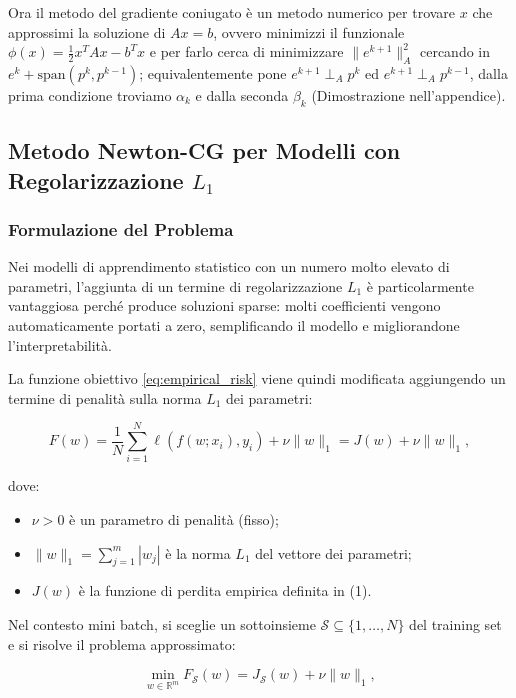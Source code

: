 \documentclass[a4paper,12pt]{article}
\begin{document}
Ora il metodo del gradiente coniugato è un metodo numerico per trovare \(x\) che approssimi la soluzione di \(Ax = b\), ovvero minimizzi il funzionale $
\phi(x) = \frac{1}{2}x^T A x - b^T x$
e per farlo cerca di minimizzare \(\|e^{k+1}\|_A^2\) cercando in \(e^k + \text{span}(p^k, p^{k-1})\); equivalentemente pone \(e^{k+1} \perp_A p^k\) ed \(e^{k+1} \perp_A p^{k-1}\), dalla prima condizione troviamo \(\alpha_k\) e dalla seconda \(\beta_k\) (Dimostrazione nell'appendice).
\newpage
\subsection{Metodo Newton-CG per Modelli con Regolarizzazione $L_1$}

\subsubsection{Formulazione del Problema}

Nei modelli di apprendimento statistico con un numero molto elevato di parametri,
l'aggiunta di un termine di regolarizzazione $L_1$ è particolarmente vantaggiosa
perché produce soluzioni sparse: molti coefficienti vengono
automaticamente portati a zero, semplificando il modello e migliorandone
l'interpretabilità.

La funzione obiettivo \eqref{eq:empirical_risk} viene quindi modificata aggiungendo un termine di
penalità sulla norma $L_1$ dei parametri:

\begin{equation}
F(w) = \frac{1}{N}\sum_{i=1}^{N} \ell(f(w;x_i),y_i) + \nu \|w\|_1 = J(w) + \nu \|w\|_1, \tag{6.1}
\end{equation}

dove:
\begin{itemize}
    \item $\nu > 0$ è un parametro di penalità (fisso);
    \item $\|w\|_1 = \sum_{j=1}^{m} |w_j|$ è la norma $L_1$ del vettore dei parametri;
    \item $J(w)$ è la funzione di perdita empirica definita in (1).
\end{itemize}

Nel contesto mini batch, si sceglie un sottoinsieme $\mathcal{S} \subseteq \{1,\dots,N\}$
del training set e si risolve il problema approssimato:

\begin{equation}
\min_{w \in \mathbb{R}^m} F_{\mathcal{S}}(w) = J_{\mathcal{S}}(w) + \nu \|w\|_1, \tag{6.2}
\end{equation}
\end{document}
